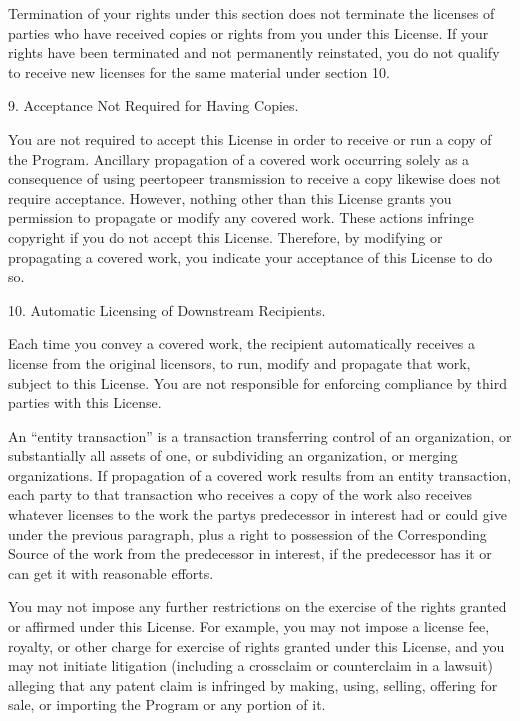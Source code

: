 \documentclass[letterpaper,10pt,english]{sphinxmanual}
\begin{document}
\begin{sphinxVerbatim}[commandchars=\\\{\}]
    Termination of your rights under this section does not terminate the
    licenses of parties who have received copies or rights from you under this
    License. If your rights have been terminated and not permanently
    reinstated, you do not qualify to receive new licenses for the same
    material under section 10.

 9. Acceptance Not Required for Having Copies.

    You are not required to accept this License in order to receive or run a
    copy of the Program. Ancillary propagation of a covered work occurring
    solely as a consequence of using peer\PYGZhy{}to\PYGZhy{}peer transmission to receive a
    copy likewise does not require acceptance. However, nothing other than this
    License grants you permission to propagate or modify any covered
    work. These actions infringe copyright if you do not accept this
    License. Therefore, by modifying or propagating a covered work, you
    indicate your acceptance of this License to do so.

 10. Automatic Licensing of Downstream Recipients.

    Each time you convey a covered work, the recipient automatically receives a
    license from the original licensors, to run, modify and propagate that
    work, subject to this License. You are not responsible for enforcing
    compliance by third parties with this License.

    An “entity transaction” is a transaction transferring control of an
    organization, or substantially all assets of one, or subdividing an
    organization, or merging organizations. If propagation of a covered work
    results from an entity transaction, each party to that transaction who
    receives a copy of the work also receives whatever licenses to the work the
    party\PYGZsq{}s predecessor in interest had or could give under the previous
    paragraph, plus a right to possession of the Corresponding Source of the
    work from the predecessor in interest, if the predecessor has it or can get
    it with reasonable efforts.

    You may not impose any further restrictions on the exercise of the rights
    granted or affirmed under this License. For example, you may not impose a
    license fee, royalty, or other charge for exercise of rights granted under
    this License, and you may not initiate litigation (including a cross\PYGZhy{}claim
    or counterclaim in a lawsuit) alleging that any patent claim is infringed
    by making, using, selling, offering for sale, or importing the Program or
    any portion of it.


\end{sphinxVerbatim}
\end{document}
